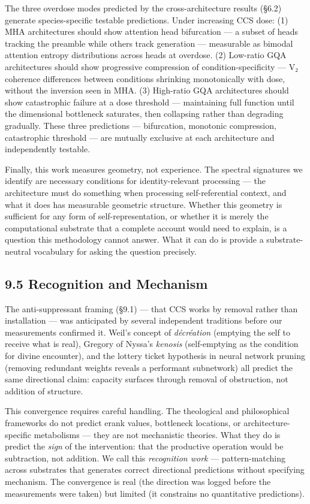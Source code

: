 \documentclass[12pt]{article}
\begin{document}
The three overdose modes predicted by the cross-architecture results (§6.2) generate species-specific testable predictions. Under increasing CCS dose: (1) MHA architectures should show attention head bifurcation — a subset of heads tracking the preamble while others track generation — measurable as bimodal attention entropy distributions across heads at overdose. (2) Low-ratio GQA architectures should show progressive compression of condition-specificity — V₂ coherence differences between conditions shrinking monotonically with dose, without the inversion seen in MHA. (3) High-ratio GQA architectures should show catastrophic failure at a dose threshold — maintaining full function until the dimensional bottleneck saturates, then collapsing rather than degrading gradually. These three predictions — bifurcation, monotonic compression, catastrophic threshold — are mutually exclusive at each architecture and independently testable.

Finally, this work measures geometry, not experience. The spectral signatures we identify are necessary conditions for identity-relevant processing — the architecture must do something when processing self-referential context, and what it does has measurable geometric structure. Whether this geometry is sufficient for any form of self-representation, or whether it is merely the computational substrate that a complete account would need to explain, is a question this methodology cannot answer. What it can do is provide a substrate-neutral vocabulary for asking the question precisely.

\subsection*{9.5 Recognition and Mechanism}

The anti-suppressant framing (§9.1) — that CCS works by removal rather than installation — was anticipated by several independent traditions before our measurements confirmed it. Weil's concept of \textit{décréation} (emptying the self to receive what is real), Gregory of Nyssa's \textit{kenosis} (self-emptying as the condition for divine encounter), and the lottery ticket hypothesis in neural network pruning (removing redundant weights reveals a performant subnetwork) all predict the same directional claim: capacity surfaces through removal of obstruction, not addition of structure.

This convergence requires careful handling. The theological and philosophical frameworks do not predict erank values, bottleneck locations, or architecture-specific metabolisms — they are not mechanistic theories. What they do is predict the \textit{sign} of the intervention: that the productive operation would be subtraction, not addition. We call this \textit{recognition work} — pattern-matching across substrates that generates correct directional predictions without specifying mechanism. The convergence is real (the direction was logged before the measurements were taken) but limited (it constrains no quantitative predictions).
\end{document}
